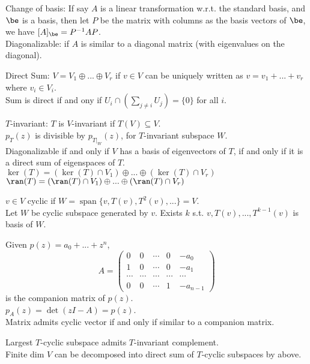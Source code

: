 \documentclass[10pt]{LatexTemplate/hw}
\begin{document}
\begin{multicols*}{2}
Change of basis: If say $A$ is a linear transformation w.r.t. the standard basis, and $\be$ is a basis, then let $P$ be the matrix with columns as the basis vectors of $\be$, we have $[A]_{\be} = P^{-1}AP$.\\
Diagonalizable: if $A$ is similar to a diagonal matrix (with eigenvalues on the diagonal).

Direct Sum: $V=V_1\oplus...\oplus V_r$ if $v\in V$ can be uniquely written as $v=v_1+...+v_r$ where $v_i\in V_i$.\\
Sum is direct if and ony if $U_i\cap(\sum_{j\neq i}U_j) = \{0\}$ for all $i$.

$T$-invariant: $T$ is $V$-invariant if $T(V)\subseteq V$.\\
$p_T(z)$ is divisible by $p_{T|_W}(z)$, for $T$-invariant subspace $W$.\\
Diagonalizable if and only if $V$ has a basis of eigenvectors of $T$, if and only if it is a direct sum of eigenspaces of $T$.\\
$\ker(T)=(\ker(T)\cap V_1)\oplus...\oplus(\ker(T)\cap V_r)$\\
$\ran(T)=(\ran(T)\cap V_1)\oplus...\oplus(\ran(T)\cap V_r)$

$v\in V$ cyclic if $W=\operatorname{span}\{v,T(v),T^2(v),...\}=V$.\\
Let $W$ be cyclic subspace generated by $v$. Exists $k$ s.t. $v,T(v),...,T^{k-1}(v)$ is basis of $W$.

Given $p(z)=a_0+...+z^n$, $$A=\begin{pmatrix}
0 & 0 & \cdots & 0 & -a_0\\
1 & 0 & \cdots & 0 & -a_1\\
\cdots & \cdots & \cdots & \cdots & \cdots\\
0 & 0 & \cdots & 1 & -a_{n-1}
\end{pmatrix}$$ is the companion matrix of $p(z)$.\\
$p_A(z)=\det(zI-A)=p(z)$.\\
Matrix admits cyclic vector if and only if similar to a companion matrix.

Largest $T$-cyclic subspace admits $T$-invariant complement.\\
Finite dim $V$ can be decomposed into direct sum of $T$-cyclic subspaces by above.


\end{multicols*}
\end{document}
